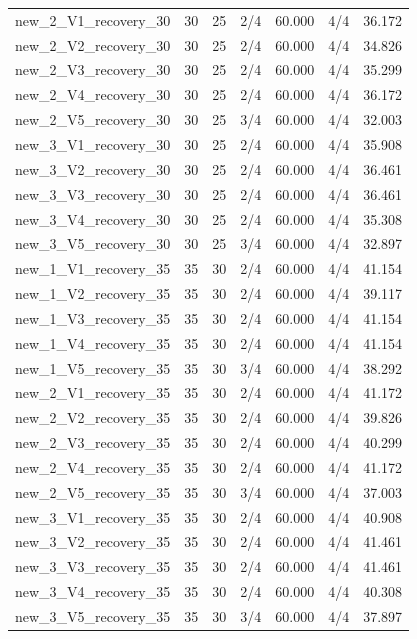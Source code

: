 \begin{longtable}{@{}p{.37\linewidth}rrrrrr@{}}
new\_2\_V1\_recovery\_30 & 30 & 25 & 2/4 & 60.000 & 4/4 & 36.172\\
new\_2\_V2\_recovery\_30 & 30 & 25 & 2/4 & 60.000 & 4/4 & 34.826\\
new\_2\_V3\_recovery\_30 & 30 & 25 & 2/4 & 60.000 & 4/4 & 35.299\\
new\_2\_V4\_recovery\_30 & 30 & 25 & 2/4 & 60.000 & 4/4 & 36.172\\
new\_2\_V5\_recovery\_30 & 30 & 25 & 3/4 & 60.000 & 4/4 & 32.003\\
new\_3\_V1\_recovery\_30 & 30 & 25 & 2/4 & 60.000 & 4/4 & 35.908\\
new\_3\_V2\_recovery\_30 & 30 & 25 & 2/4 & 60.000 & 4/4 & 36.461\\
new\_3\_V3\_recovery\_30 & 30 & 25 & 2/4 & 60.000 & 4/4 & 36.461\\
new\_3\_V4\_recovery\_30 & 30 & 25 & 2/4 & 60.000 & 4/4 & 35.308\\
new\_3\_V5\_recovery\_30 & 30 & 25 & 3/4 & 60.000 & 4/4 & 32.897\\
new\_1\_V1\_recovery\_35 & 35 & 30 & 2/4 & 60.000 & 4/4 & 41.154\\
new\_1\_V2\_recovery\_35 & 35 & 30 & 2/4 & 60.000 & 4/4 & 39.117\\
new\_1\_V3\_recovery\_35 & 35 & 30 & 2/4 & 60.000 & 4/4 & 41.154\\
new\_1\_V4\_recovery\_35 & 35 & 30 & 2/4 & 60.000 & 4/4 & 41.154\\
new\_1\_V5\_recovery\_35 & 35 & 30 & 3/4 & 60.000 & 4/4 & 38.292\\
new\_2\_V1\_recovery\_35 & 35 & 30 & 2/4 & 60.000 & 4/4 & 41.172\\
new\_2\_V2\_recovery\_35 & 35 & 30 & 2/4 & 60.000 & 4/4 & 39.826\\
new\_2\_V3\_recovery\_35 & 35 & 30 & 2/4 & 60.000 & 4/4 & 40.299\\
new\_2\_V4\_recovery\_35 & 35 & 30 & 2/4 & 60.000 & 4/4 & 41.172\\
new\_2\_V5\_recovery\_35 & 35 & 30 & 3/4 & 60.000 & 4/4 & 37.003\\
new\_3\_V1\_recovery\_35 & 35 & 30 & 2/4 & 60.000 & 4/4 & 40.908\\
new\_3\_V2\_recovery\_35 & 35 & 30 & 2/4 & 60.000 & 4/4 & 41.461\\
new\_3\_V3\_recovery\_35 & 35 & 30 & 2/4 & 60.000 & 4/4 & 41.461\\
new\_3\_V4\_recovery\_35 & 35 & 30 & 2/4 & 60.000 & 4/4 & 40.308\\
new\_3\_V5\_recovery\_35 & 35 & 30 & 3/4 & 60.000 & 4/4 & 37.897\\
\end{longtable}
